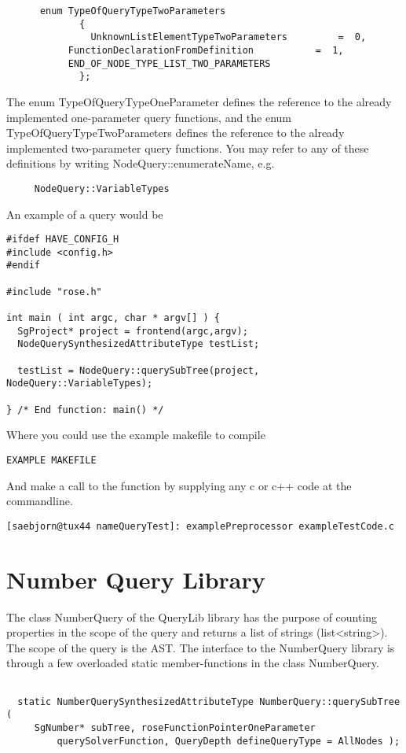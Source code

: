 {\begin{verbatim}
	  enum TypeOfQueryTypeTwoParameters
             {
               UnknownListElementTypeTwoParameters         =  0,
	       FunctionDeclarationFromDefinition           =  1,
	       END_OF_NODE_TYPE_LIST_TWO_PARAMETERS
             };
\end{verbatim}
The enum TypeOfQueryTypeOneParameter defines the reference to the
already implemented one-parameter query functions, and the enum 
TypeOfQueryTypeTwoParameters defines the reference to the already
implemented two-parameter query functions. You may refer to any of
these definitions by writing NodeQuery::enumerateName, e.g.
\begin{verbatim}
     NodeQuery::VariableTypes
\end{verbatim}
An example of a query would be 
\begin{verbatim}
#ifdef HAVE_CONFIG_H
#include <config.h>
#endif

#include "rose.h"

int main ( int argc, char * argv[] ) {
  SgProject* project = frontend(argc,argv);
  NodeQuerySynthesizedAttributeType testList;
  
  testList = NodeQuery::querySubTree(project, NodeQuery::VariableTypes);

} /* End function: main() */
\end{verbatim}
Where you could use the example makefile to compile
\begin{verbatim}
EXAMPLE MAKEFILE
\end{verbatim}
And make a call to the function by supplying any c or c++ code at the commandline.
\begin{verbatim}
[saebjorn@tux44 nameQueryTest]: examplePreprocessor exampleTestCode.c
\end{verbatim}

\section{Number Query Library}
 
The class NumberQuery of the QueryLib library has the purpose of
counting properties in the scope of the query and returns a list of
strings (list<string>). The scope of the query is
the AST. The interface to the NumberQuery library is through a few
overloaded static member-functions in the class NumberQuery.

\begin{verbatim}

  static NumberQuerySynthesizedAttributeType NumberQuery::querySubTree (
	 SgNumber* subTree, roseFunctionPointerOneParameter 
         querySolverFunction, QueryDepth defineQueryType = AllNodes );


\end{verbatim}}
